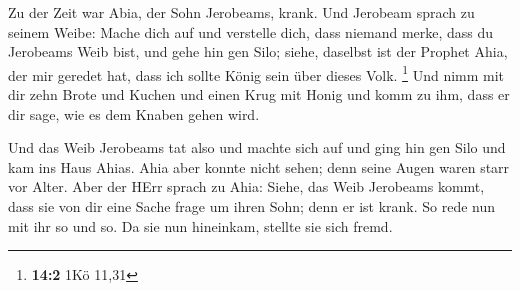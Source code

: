  Zu der Zeit war Abia, der Sohn Jerobeams, krank.
 Und Jerobeam sprach zu seinem Weibe: Mache dich auf und
verstelle dich, dass niemand merke, dass du Jerobeams Weib bist, und
gehe hin gen Silo; siehe, daselbst ist der Prophet Ahia, der mir geredet
hat, dass ich sollte König sein über dieses Volk. \footnote{\textbf{14:2}
  1Kö 11,31}  Und nimm mit dir zehn Brote und Kuchen und
einen Krug mit Honig und komm zu ihm, dass er dir sage, wie es dem
Knaben gehen wird.

 Und das Weib Jerobeams tat also und machte sich auf und
ging hin gen Silo und kam ins Haus Ahias. Ahia aber konnte nicht sehen;
denn seine Augen waren starr vor Alter.  Aber der HErr
sprach zu Ahia: Siehe, das Weib Jerobeams kommt, dass sie von dir eine
Sache frage um ihren Sohn; denn er ist krank. So rede nun mit ihr so und
so. Da sie nun hineinkam, stellte sie sich fremd.

